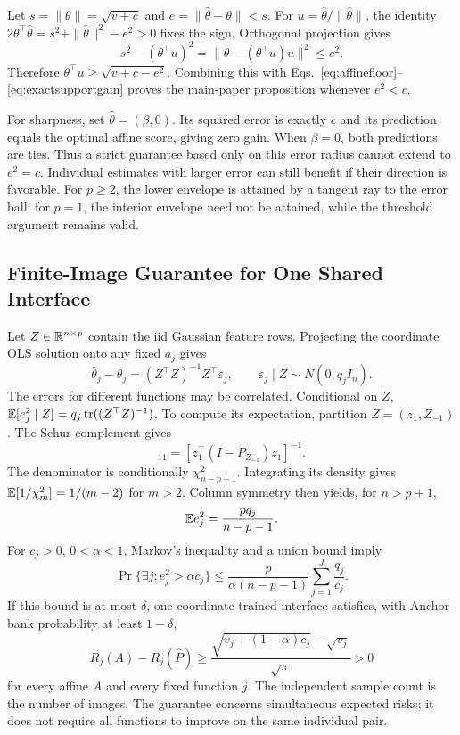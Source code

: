 Let $s=\|\theta\|=\sqrt{v+c}$ and $e=\|\widehat\theta-\theta\|<s$. For $u=\widehat\theta/\|\widehat\theta\|$, the identity
$2\theta^\top\widehat\theta=s^2+\|\widehat\theta\|^2-e^2>0$
fixes the sign. Orthogonal projection gives
\begin{equation}
 s^2-(\theta^\top u)^2
 =\|\theta-(\theta^\top u)u\|^2\le e^2.
\end{equation}
Therefore $\theta^\top u\ge\sqrt{v+c-e^2}$. Combining this with Eqs.~\eqref{eq:affinefloor}--\eqref{eq:exactsupportgain} proves the main-paper proposition whenever $e^2<c$.

For sharpness, set $\widehat\theta=(\beta,0)$. Its squared error is exactly $c$ and its prediction equals the optimal affine score, giving zero gain. When $\beta=0$, both predictions are ties. Thus a strict guarantee based only on this error radius cannot extend to $e^2=c$. Individual estimates with larger error can still benefit if their direction is favorable. For $p\ge2$, the lower envelope is attained by a tangent ray to the error ball; for $p=1$, the interior envelope need not be attained, while the threshold argument remains valid.

\subsection{Finite-Image Guarantee for One Shared Interface}
Let $Z\in\mathbb R^{n\times p}$ contain the iid Gaussian feature rows. Projecting the coordinate OLS solution onto any fixed $a_j$ gives
\begin{equation}
 \widehat\theta_j-\theta_j=(Z^\top Z)^{-1}Z^\top\varepsilon_j,
 \qquad \varepsilon_j\mid Z\sim N(0,q_j I_n).
\end{equation}
The errors for different functions may be correlated. Conditional on $Z$,
$\mathbb E[e_j^2\mid Z]=q_j\operatorname{tr}((Z^\top Z)^{-1})$.
To compute its expectation, partition $Z=(z_1,Z_{-1})$. The Schur complement gives
\begin{equation}
 [(Z^\top Z)^{-1}]_{11}
 =[z_1^\top(I-P_{Z_{-1}})z_1]^{-1}.
\end{equation}
The denominator is conditionally $\chi^2_{n-p+1}$. Integrating its density gives $\mathbb E[1/\chi^2_m]=1/(m-2)$ for $m>2$. Column symmetry then yields, for $n>p+1$,
\begin{equation}
 \mathbb E e_j^2=\frac{p q_j}{n-p-1}.
\end{equation}
For $c_j>0$, $0<\alpha<1$, Markov's inequality and a union bound imply
\begin{equation}
 \Pr\{\exists j:e_j^2>\alpha c_j\}
 \le\frac{p}{\alpha(n-p-1)}\sum_{j=1}^J\frac{q_j}{c_j}.
 \label{eq:sharedprob}
\end{equation}
If this bound is at most $\delta$, one coordinate-trained interface satisfies, with Anchor-bank probability at least $1-\delta$,
\begin{equation}
 R_j(A)-R_j(\widehat P)\ge
 \frac{\sqrt{v_j+(1-\alpha)c_j}-\sqrt{v_j}}{\sqrt\pi}>0
\end{equation}
for every affine $A$ and every fixed function $j$. The independent sample count is the number of images. The guarantee concerns simultaneous expected risks; it does not require all functions to improve on the same individual pair.

